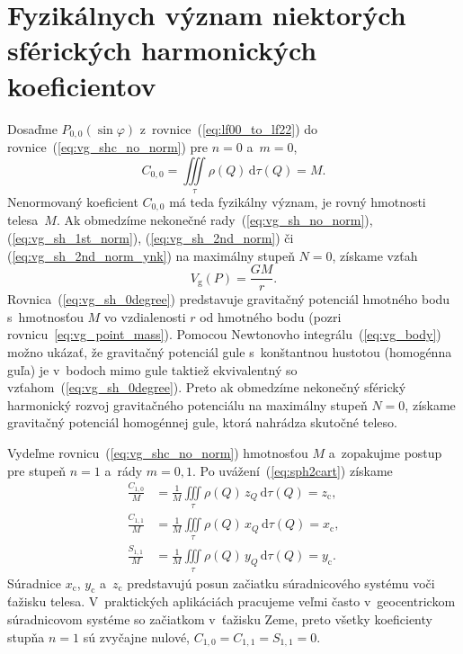 \documentclass[a4paper, 12pt]{book}
\newcommand{\diff}{\mathrm d}
\newcommand{\gidx}{\mathrm g}
\begin{document}

\section{Fyzikálnych význam niektorých sférických harmonických koeficientov}
\label{sec:physical_meaning_of_spherical_harmonic_coefficients}

Dosaďme $P_{0,0}(\sin\varphi)$ z~rovnice~(\ref{eq:lf00_to_lf22})
do rovnice~(\ref{eq:vg_shc_no_norm}) pre $n = 0$ a~$m = 0$,
%
\begin{equation}
\label{eq:c00_mass}
C_{0,0} = \iiint\limits_{\tau} \rho(Q) \, \diff \tau(Q) = M{.}
\end{equation}
%
Nenormovaný koeficient $C_{0,0}$ má teda fyzikálny význam, je rovný hmotnosti 
telesa~$M$.  Ak obmedzíme nekonečné rady~(\ref{eq:vg_sh_no_norm}), 
(\ref{eq:vg_sh_1st_norm}), (\ref{eq:vg_sh_2nd_norm}) či 
(\ref{eq:vg_sh_2nd_norm_ynk}) na maximálny stupeň $N = 0$, získame vzťah
%
\begin{equation}
\label{eq:vg_sh_0degree}
V_\gidx(P) = \frac{GM}{r}{.}
\end{equation}
%
Rovnica~(\ref{eq:vg_sh_0degree}) predstavuje gravitačný potenciál hmotného bodu 
s~hmotnosťou $M$ vo vzdialenosti $r$ od hmotného bodu (pozri 
rovnicu~\ref{eq:vg_point_mass}).  Pomocou Newtonovho 
integrálu~(\ref{eq:vg_body}) možno ukázať, že gravitačný potenciál gule 
s~konštantnou hustotou (homogénna guľa) je v~bodoch mimo gule taktiež 
ekvivalentný so vzťahom~(\ref{eq:vg_sh_0degree}).  Preto ak obmedzíme nekonečný 
sférický harmonický rozvoj gravitačného potenciálu na maximálny stupeň $N = 0$, 
získame gravitačný potenciál homogénnej gule, ktorá nahrádza skutočné teleso.

Vydeľme rovnicu~(\ref{eq:vg_shc_no_norm}) hmotnosťou $M$ a~zopakujme postup pre
stupeň $n = 1$ a~rády $m = 0, 1$.  Po uvážení~(\ref{eq:sph2cart}) získame
%
\begin{equation}
\begin{split}
\frac{C_{1,0}}{M} &= \frac{1}{M} \iiint\limits_{\tau} \rho(Q) \, z_Q \, \diff 
\tau(Q) = z_\mathrm{c}{,}\\
\frac{C_{1,1}}{M} &= \frac{1}{M} \iiint\limits_{\tau} \rho(Q) \, x_Q \, \diff 
\tau(Q) = x_\mathrm{c}{,}\\
\frac{S_{1,1}}{M} &= \frac{1}{M} \iiint\limits_{\tau} \rho(Q) \, y_Q \, \diff 
\tau(Q) = y_\mathrm{c}{.}
\end{split}
\end{equation}
%
Súradnice $x_\mathrm{c}$, $y_\mathrm{c}$ a~$z_\mathrm{c}$ predstavujú posun
začiatku súradnicového systému voči ťažisku telesa.  V~praktických aplikáciách 
pracujeme veľmi často v~geocentrickom súradnicovom systéme so
začiatkom v~ťažisku Zeme, preto všetky koeficienty stupňa $n = 1$ sú zvyčajne
nulové, $C_{1,0} = C_{1,1} = S_{1,1} = 0$.
\end{document}
